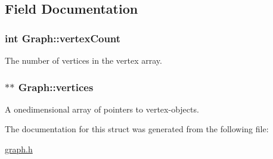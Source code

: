 \subsection{Field Documentation}
\subsubsection[{\texorpdfstring{vertex\+Count}{vertexCount}}]{\setlength{\rightskip}{0pt plus 5cm}int Graph\+::vertex\+Count}\hypertarget{structGraph_aa61a470b538b8c5836ae3f3e6a4dc438}{}\label{structGraph_aa61a470b538b8c5836ae3f3e6a4dc438}
The number of vertices in the vertex array. 
\subsubsection[{\texorpdfstring{vertices}{vertices}}]{$\ast$$\ast$ Graph\+::vertices}\hypertarget{structGraph_a78b1f05b8d7d75efa2da1688f7ab4e85}{}\label{structGraph_a78b1f05b8d7d75efa2da1688f7ab4e85}
A onedimensional array of pointers to vertex-\/objects. 

The documentation for this struct was generated from the following file\+:\begin{DoxyCompactItemize}
\item 
\hyperlink{graph_8h}{graph.\+h}\end{DoxyCompactItemize}
